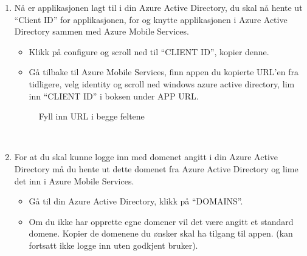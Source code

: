 \begin{enumerate}
\item Nå er applikasjonen lagt til i din Azure Active Directory, du skal nå hente ut “Client ID” for applikasjonen, for og knytte applikasjonen i Azure Active Directory sammen med Azure Mobile Services. 
\\
\begin{itemize}
\item Klikk på configure og scroll ned til “CLIENT ID”, kopier denne.
\item Gå tilbake til Azure Mobile Services, finn appen du kopierte URL’en fra tidligere, velg identity og scroll ned windows azure active directory, lim inn “CLIENT ID” i boksen under APP URL. 
\end{itemize}
\bigskip
\begin{figure}[H]
    \centering
    \setlength{\fboxsep}{0pt}%
    \setlength{\fboxrule}{1pt}%
    \caption{Fyll inn URL i begge feltene}
\end{figure}
\\
\item For at du skal kunne logge inn med domenet angitt i din Azure Active Directory må du hente ut dette domenet fra Azure Active Directory og lime det inn i Azure Mobile Services. 
\\
\begin{itemize}
\item Gå til din Azure Active Directory, klikk på “DOMAINS”. 
\item Om du ikke har opprette egne domener vil det være angitt et standard domene. Kopier de domenene du ønsker skal ha tilgang til appen. (kan fortsatt ikke logge inn uten godkjent bruker).

\end{itemize}
\end{enumerate}

